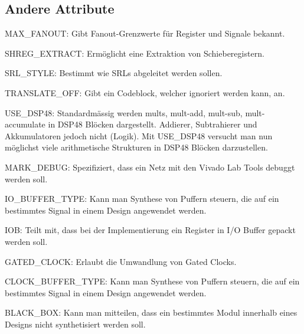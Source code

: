 \subsection{Andere Attribute}
\begin{compactitem}
    \item MAX\_FANOUT: Gibt Fanout-Grenzwerte für Register und Signale bekannt.
    \item SHREG\_EXTRACT: Ermöglicht eine Extraktion von Schieberegistern.
    \item SRL\_STYLE: Bestimmt wie SRLs abgeleitet werden sollen.
    \item TRANSLATE\_OFF: Gibt ein Codeblock, welcher ignoriert werden kann, an.
    \item USE\_DSP48: Standardmässig werden mults, mult-add, mult-sub, mult-accumulate in DSP48 Blöcken dargestellt. Addierer, Subtrahierer und Akkumulatoren jedoch nicht (Logik). Mit USE\_DSP48 versucht man nun möglichst viele arithmetische Strukturen in DSP48 Blöcken darzustellen.
    \item MARK\_DEBUG: Spezifiziert, dass ein Netz mit den Vivado Lab Tools debuggt werden soll.
    \item IO\_BUFFER\_TYPE: Kann man Synthese von Puffern steuern, die auf ein bestimmtes Signal in einem Design angewendet werden.
    \item IOB: Teilt mit, dass bei der Implementierung ein Register in I/O Buffer gepackt werden soll.
    \item GATED\_CLOCK: Erlaubt die Umwandlung von Gated Clocks.
    \item CLOCK\_BUFFER\_TYPE: Kann man Synthese von Puffern steuern, die auf ein bestimmtes Signal in einem Design angewendet werden.
    \item BLACK\_BOX: Kann man mitteilen, dass ein bestimmtes Modul innerhalb eines Designs nicht synthetisiert werden soll.
\end{compactitem}